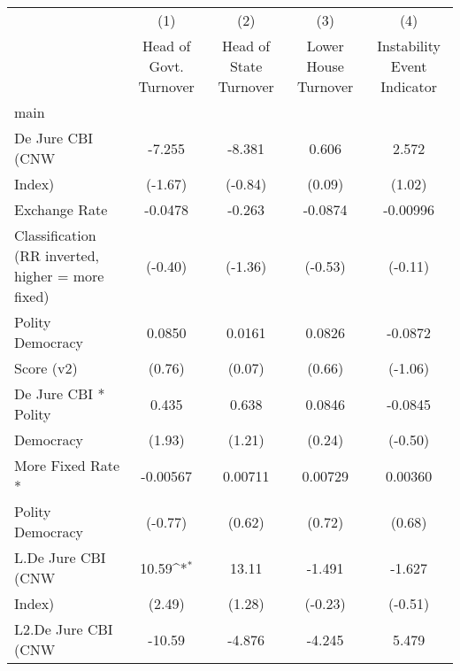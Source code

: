 {
\def\sym#1{\ifmmode^{#1}\else\(^{#1}\)\fi}
\begin{tabular}{l*{4}{c}}
\hline\hline
                    &\multicolumn{1}{c}{(1)}&\multicolumn{1}{c}{(2)}&\multicolumn{1}{c}{(3)}&\multicolumn{1}{c}{(4)}\\
                    &\multicolumn{1}{c}{Head of Govt. Turnover}&\multicolumn{1}{c}{Head of State Turnover}&\multicolumn{1}{c}{Lower House Turnover}&\multicolumn{1}{c}{Instability Event Indicator}\\
\hline
main                &                     &                     &                     &                     \\
De Jure CBI (CNW    &      -7.255         &      -8.381         &       0.606         &       2.572         \\
Index)              &     (-1.67)         &     (-0.84)         &      (0.09)         &      (1.02)         \\
[1em]
Exchange Rate       &     -0.0478         &      -0.263         &     -0.0874         &    -0.00996         \\
Classification (RR inverted, higher = more fixed)&     (-0.40)         &     (-1.36)         &     (-0.53)         &     (-0.11)         \\
[1em]
Polity Democracy    &      0.0850         &      0.0161         &      0.0826         &     -0.0872         \\
Score (v2)          &      (0.76)         &      (0.07)         &      (0.66)         &     (-1.06)         \\
[1em]
De Jure CBI * Polity&       0.435         &       0.638         &      0.0846         &     -0.0845         \\
Democracy           &      (1.93)         &      (1.21)         &      (0.24)         &     (-0.50)         \\
[1em]
More Fixed Rate *   &    -0.00567         &     0.00711         &     0.00729         &     0.00360         \\
Polity Democracy    &     (-0.77)         &      (0.62)         &      (0.72)         &      (0.68)         \\
[1em]
L.De Jure CBI (CNW  &       10.59\sym{*}  &       13.11         &      -1.491         &      -1.627         \\
Index)              &      (2.49)         &      (1.28)         &     (-0.23)         &     (-0.51)         \\
[1em]
L2.De Jure CBI (CNW &      -10.59         &      -4.876         &      -4.245         &       5.479         \\

\end{tabular}}
